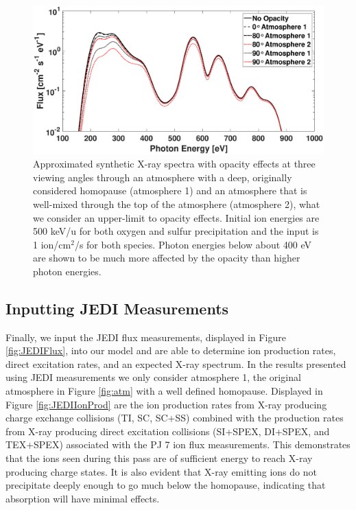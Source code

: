 \documentclass[draft]{agujournal2018}
\begin{document}
\begin{figure}
    \centering
    \includegraphics[width=\textwidth]{Figures/OpacityATM1ATM2.eps}
    \caption{Approximated synthetic X-ray spectra with opacity effects at three viewing angles through an atmosphere with a deep, originally considered homopause (atmosphere 1) and an atmosphere that is well-mixed through the top of the atmosphere (atmosphere 2), what we consider an upper-limit to opacity effects. Initial ion energies are 500 keV/u for both oxygen and sulfur precipitation and the input is 1 ion/cm$^2$/s for both species. Photon energies below about 400 eV are shown to be much more affected by the opacity than higher photon energies.}
    \label{fig:XraySpecOpac}
\end{figure}

\subsection{Inputting JEDI Measurements}
\label{sec:JEDIMeasurements}

Finally, we input the JEDI flux measurements, displayed in Figure \ref{fig:JEDIFlux}, into our model and are able to determine ion production rates, direct excitation rates, and an expected X-ray spectrum.
In the results presented using JEDI measurements we only consider atmosphere 1, the original atmosphere in Figure \ref{fig:atm} with a well defined homopause.
Displayed in Figure \ref{fig:JEDIIonProd} are the ion production rates from X-ray producing charge exchange collisions (TI, SC, SC+SS) combined with the production rates from X-ray producing direct excitation collisions (SI+SPEX, DI+SPEX, and TEX+SPEX) associated with the PJ 7 ion flux measurements.
This demonstrates that the ions seen during this pass are of sufficient energy to reach X-ray producing charge states.
It is also evident that X-ray emitting ions do not precipitate deeply enough to go much below the homopause, indicating that absorption will have minimal effects.
\end{document}
